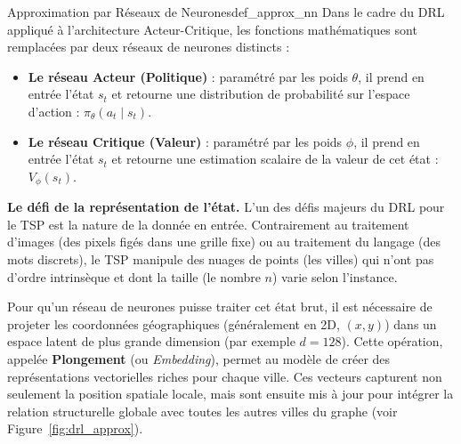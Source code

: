 \documentclass[12pt, a4paper, twoside, openright]{book}
\begin{document}
	\begin{definition}{Approximation par Réseaux de Neurones}{def_approx_nn}
		Dans le cadre du DRL appliqué à l'architecture Acteur-Critique, les fonctions mathématiques sont remplacées par deux réseaux de neurones distincts :
		\begin{itemize}
			\item \textbf{Le réseau Acteur (Politique)} : paramétré par les poids $\theta$, il prend en entrée l'état $s_t$ et retourne une distribution de probabilité sur l'espace d'action : $\pi_\theta(a_t \mid s_t)$.
			\item \textbf{Le réseau Critique (Valeur)} : paramétré par les poids $\phi$, il prend en entrée l'état $s_t$ et retourne une estimation scalaire de la valeur de cet état : $V_\phi(s_t)$.
		\end{itemize}
	\end{definition}
	
	\textbf{Le défi de la représentation de l'état.}
	L'un des défis majeurs du DRL pour le TSP est la nature de la donnée en entrée. Contrairement au traitement d'images (des pixels figés dans une grille fixe) ou au traitement du langage (des mots discrets), le TSP manipule des nuages de points (les villes) qui n'ont pas d'ordre intrinsèque et dont la taille (le nombre $n$) varie selon l'instance.
	
	Pour qu'un réseau de neurones puisse traiter cet état brut, il est nécessaire de projeter les coordonnées géographiques (généralement en 2D, $(x,y)$) dans un espace latent de plus grande dimension (par exemple $d = 128$). Cette opération, appelée \textbf{Plongement} (ou \textit{Embedding}), permet au modèle de créer des représentations vectorielles riches pour chaque ville. Ces vecteurs capturent non seulement la position spatiale locale, mais sont ensuite mis à jour pour intégrer la relation structurelle globale avec toutes les autres villes du graphe (voir Figure~\ref{fig:drl_approx}).
	
\end{document}
